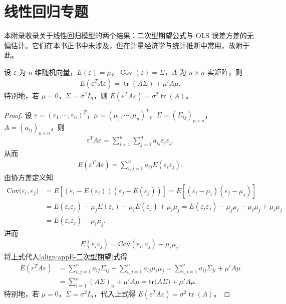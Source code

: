 \documentclass[../main.tex]{subfiles}
\begin{document}
\chapter{线性回归专题}\label{chapter:appE-线性回归专题}

本附录收录关于线性回归模型的两个结果：二次型期望公式与 OLS 误差方差的无偏估计。它们在本书正书中未涉及，但在计量经济学与统计推断中常用，故附于此。

\begin{lemma}[二次型期望公式]\label{lemma:appE-二次型期望公式}
设 $\varepsilon$ 为 $n$ 维随机向量，$E(\varepsilon)=\mu$，$\operatorname{Cov}(\varepsilon)=\Sigma$，$A$ 为 $n\times n$ 实矩阵，则
\begin{align*}
E(\varepsilon^T A \varepsilon) = \operatorname{tr}(A\Sigma) + \mu' A \mu.
\end{align*}
特别地，若 $\mu=0$，$\Sigma=\sigma^2 I_n$，则 $E(\varepsilon^TA\varepsilon)=\sigma^2\operatorname{tr}(A)$。
\end{lemma}

\begin{proof}
设 $\varepsilon =(\varepsilon_1,\cdots,\varepsilon_n)^T$，$\mu =(\mu_1,\cdots,\mu_n)^T$，$\Sigma =(\Sigma_{ij})_{n\times n}$，$A=(a_{ij})_{n\times n}$，则
\begin{align*}
\varepsilon^T A \varepsilon = \sum_{i=1}^n\sum_{j=1}^n a_{ij}\varepsilon_i\varepsilon_j.
\end{align*}
从而
\begin{align}\label{align:appE-二次型期望}
E(\varepsilon^T A\varepsilon )=\sum_{i,j=1}^n{a_{ij}E(\varepsilon _i\varepsilon _j)}.
\end{align}
由协方差定义知
\begin{align*}
\mathrm{Cov(}\varepsilon _i,\varepsilon _j)&=E\left[ \left( \varepsilon _i-E\left( \varepsilon _i \right) \right) \left( \varepsilon _j-E\left( \varepsilon _j \right) \right) \right]
=E\left[ \left( \varepsilon _i-\mu _i \right) \left( \varepsilon _j-\mu _j \right) \right] \\
&=E\left( \varepsilon _i\varepsilon _j \right) -\mu _jE\left( \varepsilon _i \right) -\mu _iE\left( \varepsilon _j \right) +\mu _i\mu _j=E\left( \varepsilon _i\varepsilon _j \right) -\mu _j\mu _i-\mu _i\mu _j+\mu _i\mu _j \\
&=E\left( \varepsilon _i\varepsilon _j \right) -\mu _i\mu _j.
\end{align*}
进而
\begin{align*}
E\left( \varepsilon _i\varepsilon _j \right) =\mathrm{Cov}\left( \varepsilon _i,\varepsilon _j \right) +\mu _i\mu _j.
\end{align*}
将上式代入\eqref{align:appE-二次型期望}式得
\begin{align*}
E(\varepsilon^T A\varepsilon )&=\sum_{i,j=1}^n{a_{ij}\Sigma _{ij}}+\sum_{i,j=1}^n{a_{ij}\mu _i\mu _j}=\sum_{i,j=1}^n{a_{ij}\Sigma _{ji}}+\mu ' A\mu \\
&=\sum_{i=1}^n{(A\Sigma )_{ii}}+\mu' A\mu =\mathrm{tr(}A\Sigma )+\mu' A\mu .
\end{align*}
特别地，若 $\mu=0$，$\Sigma=\sigma^2 I_n$，代入上式得 $E(\varepsilon^TA\varepsilon)=\sigma^2\operatorname{tr}(A)$。
\end{proof}
\end{document}
